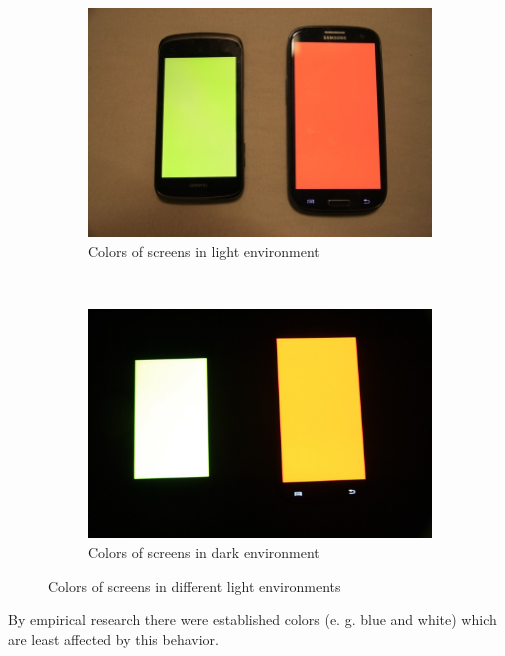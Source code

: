 \begin{figure}[h]
        \centering
        \begin{subfigure}[b]{0.4\textwidth}
                \includegraphics[width=\textwidth]{evaluation/IMG_7029.JPG}
                \caption{Colors of screens in light environment}
                \label{fig:tiger}
        \end{subfigure}
        ~ %
        \begin{subfigure}[b]{0.4\textwidth}
                \includegraphics[width=\textwidth]{evaluation/IMG_7032.JPG}
                \caption{Colors of screens in dark environment}
                \label{fig:mouse}
        \end{subfigure}
        \caption{Colors of screens in different light environments}\label{fig:screen_colors_in_enviroments}
\end{figure}
By empirical research there were established colors (e. g. blue and white) which are least affected by this behavior.
